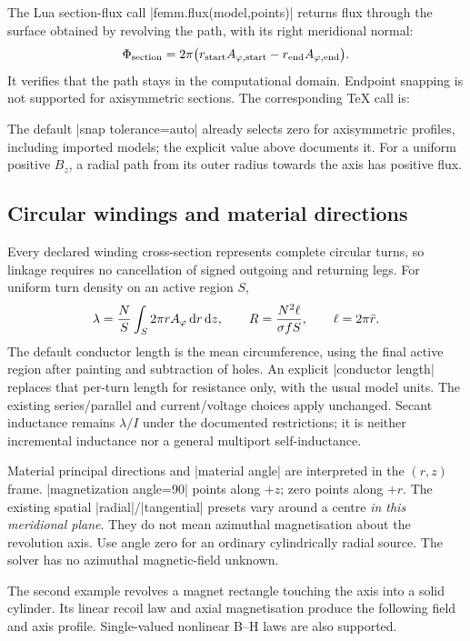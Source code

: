 The Lua section-flux call |femm.flux(model,points)| returns flux through the
surface obtained by revolving the path, with its right meridional normal:
\[
 \Phi_{\rm section}=2\pi\bigl(r_{\rm start}A_{\varphi,\rm start}
                    -r_{\rm end}A_{\varphi,\rm end}\bigr).
\]
It verifies that the path stays in the computational domain. Endpoint snapping
is not supported for axisymmetric sections. The corresponding TeX call is:
\begin{codeexample}
\femmflux[profile=name,snap tolerance=0]
\end{codeexample}
The default |snap tolerance=auto| already selects zero for axisymmetric
profiles, including imported models; the explicit value above documents it. For a uniform positive $B_z$, a
radial path from its outer radius towards the axis has positive flux.

\subsection{Circular windings and material directions}
Every declared winding cross-section represents complete circular turns, so
linkage requires no cancellation of signed outgoing and returning legs.
For uniform turn density on an active region $S$,
\[
 \lambda={N\over S}\int_S 2\pi r A_\varphi\,\mathrm dr\,\mathrm dz,
 \qquad R={N^2\ell\over\sigma fS},\qquad
 \ell=2\pi\bar r.
\]
The default conductor length is the mean circumference, using the final active
region after painting and subtraction of holes. An explicit |conductor length|
replaces that per-turn length for resistance only, with the usual model units.
The existing series/parallel and current/voltage choices apply unchanged.
Secant inductance remains $\lambda/I$ under the documented restrictions; it
is neither incremental inductance nor a general multiport self-inductance.

Material principal directions and |material angle| are interpreted in the
$(r,z)$ frame. |magnetization angle=90| points along $+z$; zero points along
$+r$. The existing spatial |radial|/|tangential| presets vary around a centre
\emph{in this meridional plane}. They do not mean azimuthal magnetisation about
the revolution axis. Use angle zero for an ordinary cylindrically radial source.
The solver has no azimuthal magnetic-field unknown.

The second example revolves a magnet rectangle touching the axis into a solid
cylinder. Its linear recoil law and axial magnetisation produce the following
field and axis profile. Single-valued nonlinear B--H laws are also supported.

